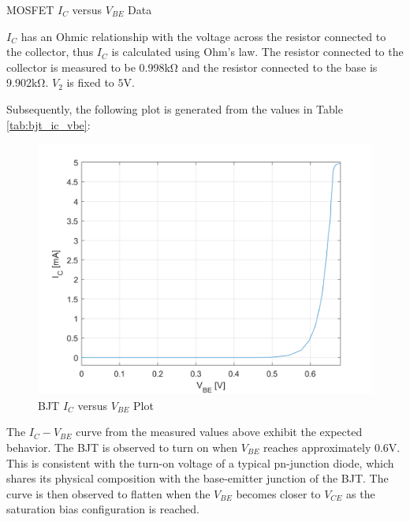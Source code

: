 \FloatBarrier

\begin{table}[h!]
	\centering
	\caption{MOSFET $I_C$ versus $V_{BE}$ Data}
	\label{tab:bjt_ic_vbe}
\end{table}

\FloatBarrier

{\footnotesize $I_C$ has an Ohmic relationship with the voltage across the resistor connected to the collector, thus $I_C$ is calculated using Ohm's law. The resistor connected to the collector is measured to be 0.998\si{\kilo\ohm} and the resistor connected to the base is 9.902\si{\kilo\ohm}. $V_2$ is fixed to $5$\si{\volt}.}

\FloatBarrier

Subsequently, the following plot is generated from the values in Table \ref{tab:bjt_ic_vbe}:

\begin{figure}[h!]
	\centering
	\includegraphics[scale=0.4]{../images/bjt_ic_vbe.PNG}
	\caption{BJT $I_C$ versus $V_{BE}$ Plot}
	\label{fig:bjt_ic_vbe}
\end{figure}

\FloatBarrier

The $I_C - V_{BE}$ curve from the measured values above exhibit the expected behavior. The BJT is observed to turn on when $V_{BE}$ reaches approximately 0.6V. This is consistent with the turn-on voltage of a typical pn-junction diode, which shares its physical composition with the base-emitter junction of the BJT. The curve is then observed to flatten when the $V_{BE}$ becomes closer to $V_{CE}$ as the saturation bias configuration is reached.

